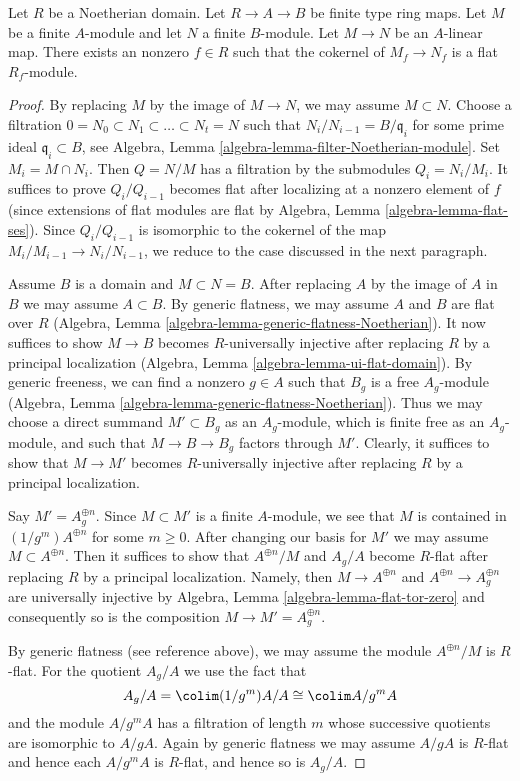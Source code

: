 \begin{lemma}
\label{lemma-cokernel-flat}
Let $R$ be a Noetherian domain. Let $R \to A \to B$ be finite type ring maps.
Let $M$ be a finite $A$-module and let $N$ a finite $B$-module.
Let $M \to N$ be an $A$-linear map. There exists an nonzero $f \in R$
such that the cokernel of $M_f \to N_f$ is a flat $R_f$-module.
\end{lemma}

\begin{proof}
By replacing $M$ by the image of $M \to N$, we may assume $M \subset N$.
Choose a filtration $0 = N_0 \subset N_1 \subset \ldots \subset N_t = N$
such that $N_i/N_{i - 1} = B/\mathfrak q_i$ for some prime ideal
$\mathfrak q_i \subset B$, see
Algebra, Lemma \ref{algebra-lemma-filter-Noetherian-module}.
Set $M_i = M \cap N_i$. Then $Q = N/M$ has a filtration by the submodules
$Q_i = N_i/M_i$. It suffices to prove $Q_i/Q_{i - 1}$ becomes flat
after localizing at a nonzero element of $f$ (since extensions of
flat modules are flat by Algebra, Lemma \ref{algebra-lemma-flat-ses}).
Since $Q_i/Q_{i - 1}$ is isomorphic to the  cokernel
of the map $M_i/M_{i - 1} \to N_i/N_{i - 1}$, we reduce to the
case discussed in the next paragraph.

\medskip\noindent
Assume $B$ is a domain and $M \subset N = B$. After replacing $A$ by the
image of $A$ in $B$ we may assume $A \subset B$. By generic flatness,
we may assume $A$ and $B$ are flat over $R$
(Algebra, Lemma \ref{algebra-lemma-generic-flatness-Noetherian}).
It now suffices to show $M \to B$ becomes $R$-universally
injective after replacing $R$ by a principal localization
(Algebra, Lemma \ref{algebra-lemma-ui-flat-domain}).
By generic freeness, we can find a nonzero $g \in A$ such that
$B_g$ is a free $A_g$-module
(Algebra, Lemma \ref{algebra-lemma-generic-flatness-Noetherian}).
Thus we may choose a direct summand $M' \subset B_g$ as an $A_g$-module,
which is finite free as an $A_g$-module, and
such that $M \to B \to B_g$ factors through $M'$.
Clearly, it suffices to show that $M \to M'$
becomes $R$-universally injective after replacing
$R$ by a principal localization.

\medskip\noindent
Say $M' = A_g^{\oplus n}$. Since $M \subset M'$ is a finite $A$-module,
we see that $M$ is contained in $(1/g^m)A^{\oplus n}$ for some $m \geq 0$.
After changing our basis for $M'$ we may assume $M \subset A^{\oplus n}$.
Then it suffices to show that $A^{\oplus n}/M$ and $A_g/A$ become
$R$-flat after replacing $R$ by a principal localization. Namely, then
$M \to A^{\oplus n}$ and $A^{\oplus n} \to A_g^{\oplus n}$ are
universally injective by Algebra, Lemma \ref{algebra-lemma-flat-tor-zero}
and consequently so is the composition $M \to M' = A_g^{\oplus n}$.

\medskip\noindent
By generic flatness (see reference above), we may assume the
module $A^{\oplus n}/M$ is $R$-flat. For the quotient $A_g/A$
we use the fact that
$$
A_g/A = \colim (1/g^m)A/A \cong \colim A/g^mA
$$
and the module $A/g^mA$ has a filtration of length $m$ whose
successive quotients are isomorphic to $A/gA$. Again by generic
flatness we may assume $A/gA$ is $R$-flat and hence each $A/g^mA$
is $R$-flat, and hence so is $A_g/A$.
\end{proof}

